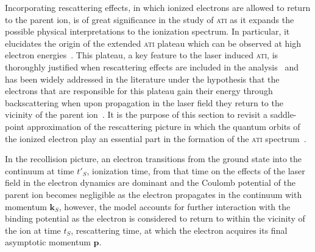 Incorporating rescattering effects, in which ionized electrons are
allowed to return to the parent ion, is of great significance in the
study of \textsc{ati} as it expands the possible physical
interpretations to the ionization spectrum. In particular, it
elucidates the origin of the extended \textsc{ati} plateau which can
be observed at high electron energies~\cite{Walker_1996}. This
plateau, a key feature to the laser induced \textsc{ati}, is
thoroughly justified when rescattering effects are included in the
analysis~\cite{Paulus_1994plateau,BeckerRescattering_2018} and has
been widely addressed in the literature under the hypothesis that the
electrons that are responsible for this plateau gain their energy
through backscattering when upon propagation in the laser field they
return to the vicinity of the parent
ion~\cite{Paulus_1994plateau,Becker_1994plateau_classical,Becker_rescattering1994}. It
is the purpose of this section to revisit a saddle-point approximation
of the rescattering picture in which the quantum orbits of the ionized
electron play an essential part in the formation of the \textsc{ati}
spectrum~\cite{KopoldOptComm2000}.




In the recollision picture, an electron transitions from the ground
state into the continuum at time $t'_{S}$, ionization time, from that
time on the effects of the laser field in the electron dynamics are
dominant and the Coulomb potential of the parent ion becomes
negligible as the electron propagates in the continuum with momentum
$\mathbf{k}_{S}$, however, the model accounts for further interaction
with the binding potential as the electron is considered to return to
within the vicinity of the ion at time $t_{S}$, rescattering time, at
which the electron acquires its final asymptotic momentum
$\mathbf{p}$.

